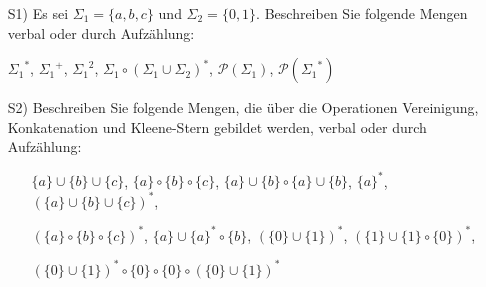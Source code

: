 \begin{exercise}
\begin{enumerate}
  \item[S1)] Es sei $\Sigma_1 = \{a, b, c\}$ und $\Sigma_2 = \{0, 1\}$.
    Beschreiben Sie folgende Mengen verbal oder durch Aufzählung:
    \begin{center}
    \mbox{${\Sigma_1}^{*}$},\;
    \mbox{${\Sigma_1}^{+}$}, \;
    \mbox{${\Sigma_1}^{2}$}, \;
    \mbox{${\Sigma_1} \circ ({\Sigma_1} \cup {\Sigma_2})^{*}$}, \;
    \mbox{$\mathcal{P}({\Sigma_1})$}, \;
    \mbox{$\mathcal{P}({\Sigma_1}^{*})$}
    \end{center}

  \item[S2)] Beschreiben Sie folgende Mengen, die über die Operationen
    Vereinigung, Konkatenation und Kleene-Stern gebildet werden,
    verbal oder durch Aufzählung:
    \begin{itemize}
      \item [] $\{a\}\cup\{b\}\cup\{c\}$,\quad
        $\{a\}\circ\{b\}\circ\{c\}$,\quad
        $\{a\}\cup\{b\}\circ\{a\}\cup\{b\}$,\quad
        $\{a\}^{*}$,\quad
        $(\{a\}\cup\{b\}\cup\{c\})^{*}$,\quad
      \item[] $(\{a\}\circ\{b\}\circ\{c\})^{*}$,\quad
        $\{a\}\cup\{a\}^{*}\circ\{b\}$,\quad
        $(\{0\}\cup\{1\})^{*}$,\quad
        $(\{1\}\cup\{1\}\circ\{0\})^{*}$,
      \item[] $(\{0\}\cup\{1\})^{*}\circ\{0\}\circ\{0\}\circ(\{0\}\cup\{1\})^{*}$
    \end{itemize}
\end{enumerate}
\end{exercise}
